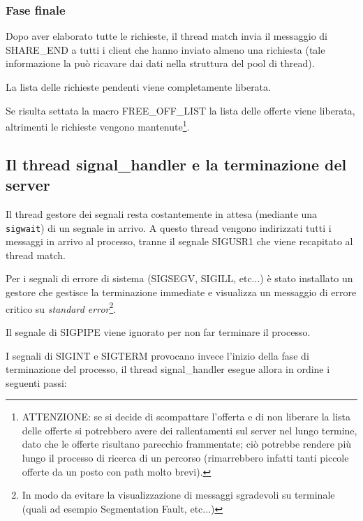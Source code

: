 \documentclass[a4paper,10pt]{article}
\begin{document}
\subsubsection{Fase finale}
Dopo aver elaborato tutte le richieste, il thread match invia il messaggio di SHARE\_END a tutti i client che hanno inviato almeno una richiesta (tale informazione la pu\`o ricavare dai dati nella struttura del pool di thread).

La lista delle richieste pendenti viene completamente liberata.

Se risulta settata la macro FREE\_OFF\_LIST la lista delle offerte viene liberata, altrimenti le richieste vengono  mantenute\footnote{ATTENZIONE: se si decide di scompattare l'offerta e di non liberare la lista delle offerte si potrebbero avere dei rallentamenti sul server nel lungo termine, dato che le offerte risultano parecchio frammentate; ci\`o potrebbe rendere pi\`u lungo il processo di ricerca di un percorso (rimarrebbero infatti tanti piccole offerte da un posto con path molto brevi).}.

\subsection{Il thread signal\_handler e la terminazione del server}

Il thread gestore dei segnali resta costantemente in attesa (mediante una \texttt{sigwait}) di un segnale in arrivo. A questo thread vengono indirizzati tutti i messaggi in arrivo al processo, tranne il segnale SIGUSR1 che viene recapitato al thread match.

Per i segnali di errore di sistema (SIGSEGV, SIGILL, etc...) \`e stato installato un gestore che gestisce la terminazione immediate e visualizza un messaggio di errore critico su \textit{standard error}\footnote{In modo da evitare la visualizzazione di messaggi sgradevoli su terminale (quali ad esempio Segmentation Fault, etc...)}.

Il segnale di SIGPIPE viene ignorato per non far terminare il processo.

I segnali di SIGINT e SIGTERM provocano invece l'inizio della fase di terminazione del processo, il thread signal\_handler esegue allora in ordine i seguenti passi:
\end{document}
